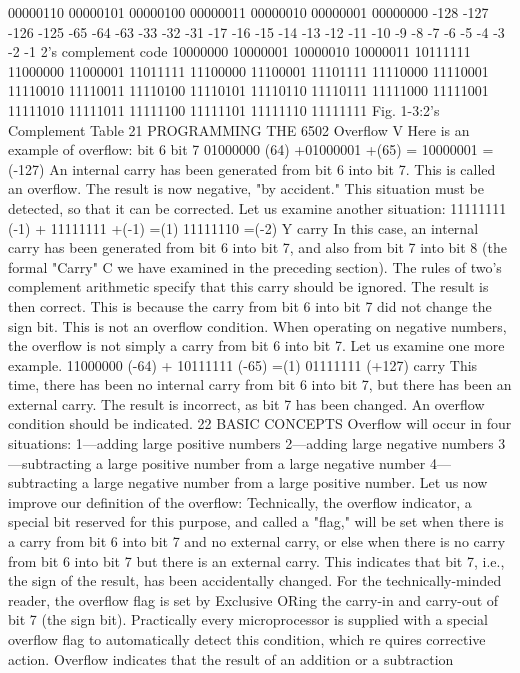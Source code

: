 \documentclass{book}
\begin{document}
00000110
00000101
00000100
00000011
00000010
00000001
00000000
-128
-127
-126
-125
-65
-64
-63
-33
-32
-31
-17
-16
-15
-14
-13
-12
-11
-10
-9
-8
-7
-6
-5
-4
-3
-2
-1
2's complement
code
10000000
10000001
10000010
10000011
10111111
11000000
11000001
11011111
11100000
11100001
11101111
11110000
11110001
11110010
11110011
11110100
11110101
11110110
11110111
11111000
11111001
11111010
11111011
11111100
11111101
11111110
11111111
Fig. 1-3:2's Complement Table
21
PROGRAMMING THE 6502
Overflow V
Here is an example of overflow:
bit 6
bit 7
01000000 (64)
+01000001 +(65)
= 10000001 =(-127)
An internal carry has been generated from bit 6 into bit 7. This is
called an overflow.
The result is now negative, "by accident." This situation must
be detected, so that it can be corrected.
Let us examine another situation:
11111111 (-1)
+ 11111111 +(-1)
=(1) 11111110 =(-2)
Y
carry
In this case, an internal carry has been generated from bit 6 into
bit 7, and also from bit 7 into bit 8 (the formal "Carry" C we have
examined in the preceding section). The rules of two's complement
arithmetic specify that this carry should be ignored. The result is
then correct.
This is because the carry from bit 6 into bit 7 did not change the
sign bit.
This is not an overflow condition. When operating on negative
numbers, the overflow is not simply a carry from bit 6 into bit 7.
Let us examine one more example.
11000000 (-64)
+ 10111111 (-65)
=(1) 01111111 (+127)
carry
This time, there has been no internal carry from bit 6 into bit 7, but
there has been an external carry. The result is incorrect, as bit 7
has been changed. An overflow condition should be indicated.
22
BASIC CONCEPTS
Overflow will occur in four situations:
1—adding large positive numbers
2—adding large negative numbers
3—subtracting a large positive number from a large negative
number
4—subtracting a large negative number from a large positive
number.
Let us now improve our definition of the overflow:
Technically, the overflow indicator, a special bit reserved for this
purpose, and called a "flag," will be set when there is a carry from
bit 6 into bit 7 and no external carry, or else when there is no carry
from bit 6 into bit 7 but there is an external carry. This indicates
that bit 7, i.e., the sign of the result, has been accidentally
changed. For the technically-minded reader, the overflow flag is
set by Exclusive ORing the carry-in and carry-out of bit 7 (the sign
bit). Practically every microprocessor is supplied with a special
overflow flag to automatically detect this condition, which re
quires corrective action.
Overflow indicates that the result of an addition or a subtraction
\end{document}
